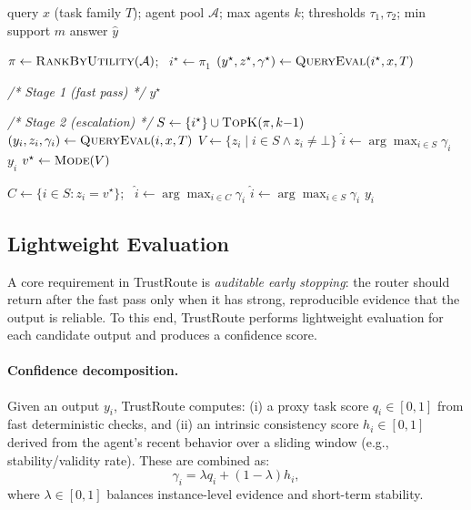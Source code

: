 \documentclass[acmsmall,screen,review,anonymous]{acmart}
\begin{document}
\begin{algorithm}[t]
\caption{TrustRoute routing (two-stage with online updates)}
\label{alg:trustroute_short}
\begin{algorithmic}[1]
\Require query $x$ (task family $T$); agent pool $\mathcal{A}$; max agents $k$;
thresholds $\tau_1,\tau_2$; min support $m$
\Ensure answer $\hat{y}$

\State $\pi \gets \Call{RankByUtility}{\mathcal{A}}$; \ $i^\star \gets \pi_1$
\State $(y^\star, z^\star, \gamma^\star) \gets \Call{QueryEval}{i^\star, x, T}$

\Statex \textit{/* Stage 1 (fast pass) */}
    \State {}
    \State \Return $y^\star$
\EndIf

\Statex \textit{/* Stage 2 (escalation) */}
\State $S \gets \{i^\star\} \cup \Call{TopK}{\pi, k{-}1}$
    \State $(y_i, z_i, \gamma_i) \gets \Call{QueryEval}{i, x, T}$
\EndFor
\State $V \gets \{z_i \mid i\in S \wedge z_i\neq \bot\}$  
    \State $\hat{i}\gets \arg\max_{i\in S}\gamma_i$  
    \State {}
    \State \Return $y_{\hat{i}}$
\EndIf
\State $v^\star \gets \Call{Mode}{V}$

    \State $C \gets \{i\in S: z_i=v^\star\}$; \ $\hat{i}\gets \arg\max_{i\in C}\gamma_i$
\Else
    \State $\hat{i}\gets \arg\max_{i\in S}\gamma_i$
\EndIf
\State {}
\State \Return $y_{\hat{i}}$
\end{algorithmic}
\end{algorithm}

\subsection{Lightweight Evaluation}
\label{sec:lightweight}
A core requirement in TrustRoute is \emph{auditable early stopping}: the router should return after the fast pass only when it has strong, reproducible evidence that the output is reliable.
To this end, TrustRoute performs lightweight evaluation for each candidate output and produces a confidence score.

\paragraph{Confidence decomposition.}
Given an output $y_i$, TrustRoute computes:
(i) a proxy task score $q_i\in[0,1]$ from fast deterministic checks, and
(ii) an intrinsic consistency score $h_i\in[0,1]$ derived from the agent's recent behavior over a sliding window (e.g., stability/validity rate).
These are combined as:
\begin{equation}
\gamma_i = \lambda q_i + (1-\lambda) h_i,
\label{eq:confidence}
\end{equation}
where $\lambda\in[0,1]$ balances instance-level evidence and short-term stability.
\end{document}
